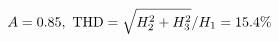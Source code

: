 \documentclass[preview]{standalone}
\begin{document}
\begin{align*}
\special{dvisvgm:raw <g id='unique000'>}A=0.85,\ \text{THD}=\sqrt{H_2^2+H_3^2}/H_1=15.4\%\special{dvisvgm:raw </g>}
\end{align*}
\end{document}
